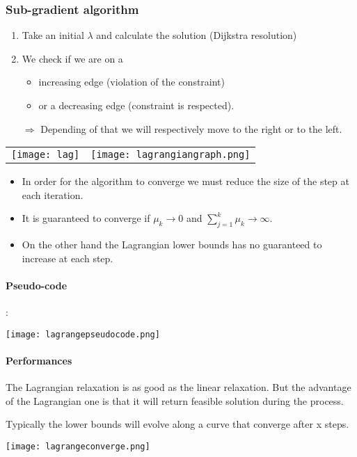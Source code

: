 \subsubsection{Sub-gradient algorithm}

\begin{enumerate}
    \item Take an initial $\lambda$ and calculate the solution (Dijkstra resolution)
    \item We check if we are on a 
        \begin{itemize}
            \item increasing edge (violation of the constraint) 
            \item or a decreasing edge (constraint is respected). 
        \end{itemize}

        $\Rightarrow$ Depending of that we will respectively move to
        the right or to the left.
\end{enumerate}

\begin{tabular}{m{9cm}m{9cm}}
    \texttt{[image: lag]}
    &
    \texttt{[image: lagrangiangraph.png]}
\end{tabular}


\begin{itemize}
    \item In order for the algorithm to converge we must reduce the size
        of the step at each iteration. 
    \item It is guaranteed to converge if $\mu_{k} \rightarrow 0$ and
        $\sum^{k}_{j=1} \mu_{k} \rightarrow \infty$.
    \item On the other hand the Lagrangian lower bounds has no
        guaranteed to increase at each step.
    \end{itemize}

\paragraph{Pseudo-code}:

\centerline{\texttt{[image: lagrangepseudocode.png]}}

\paragraph{Performances}

The Lagrangian relaxation is as good as the linear relaxation. But the
advantage of the Lagrangian one is that it will return feasible solution
during the process.

Typically the lower bounds will evolve along a curve that converge after x steps.

\centerline{\texttt{[image: lagrangeconverge.png]}}
